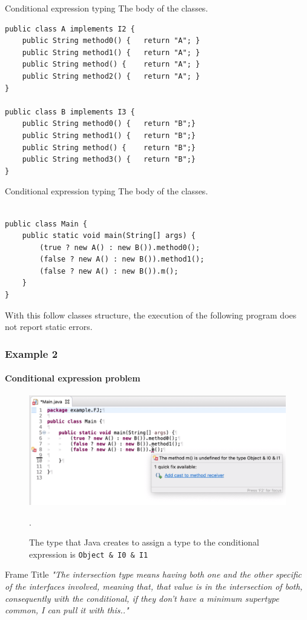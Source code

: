 \documentclass{beamer}
\begin{document}
\begin{frame}[fragile]{Conditional expression typing}
\boldmath
The body of the classes.	\begin{flushleft}
\begin{lstlisting}[basicstyle=\scriptsize]
public class A implements I2 {
	public String method0() {	return "A";	}
	public String method1() {	return "A";	}
	public String method() {	return "A";	}
	public String method2() {	return "A"; }
}

public class B implements I3 {
	public String method0() {	return "B";}
	public String method1() {	return "B";}
	public String method() {	return "B";}
	public String method3() {	return "B";}
}
\end{lstlisting}
\end{flushleft}

\end{frame}

\begin{frame}[fragile]{Conditional expression typing}
\boldmath
The body of the classes.	\begin{flushleft}
\begin{lstlisting}[basicstyle=\scriptsize]

public class Main {
	public static void main(String[] args) {
		(true ? new A() : new B()).method0();
		(false ? new A() : new B()).method1();
		(false ? new A() : new B()).m();
	}
}
\end{lstlisting}
\end{flushleft}
With this follow classes structure, the execution of the following program does not report static errors.
\end{frame}

\begin{frame}
\frametitle{Example 2}
\framesubtitle{Conditional expression problem}
\begin{figure}
\centering
\includegraphics[width=1\linewidth]{images/example-intersection-type.png}
\caption{The type that Java creates to assign a type to the conditional expression is \texttt{Object \& I0 \& I1}}.
\label{fig:mainres}
\end{figure}
\end{frame}
\begin{frame}{Frame Title}
    \textit{"The intersection type means having both one and the other specific of the interfaces involved, meaning that, that value is in the intersection of both, consequently with the conditional, if they don't have a minimum supertype common, I can pull it with this.."}
\end{frame}
\end{document}
